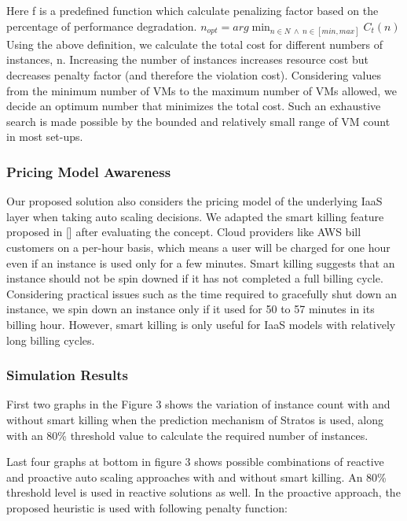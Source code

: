 Here f is a predefined function which calculate penalizing factor based on the percentage of performance degradation. $n_{opt} = arg \min_{n \in N \ \land \ n \in [min, max]}C_t(n) $
\\

Using the above definition, we calculate the total cost for different numbers of instances, n. Increasing the number of instances increases resource cost but decreases penalty factor (and therefore the violation cost). Considering values from the minimum number of VMs to the maximum number of VMs allowed, we decide an optimum number that minimizes the total cost. Such an exhaustive search is made possible by the bounded and relatively small range of VM count in most set-ups.
\subsubsection {Pricing Model Awareness}

Our proposed solution also considers the pricing model of the underlying IaaS layer when taking auto scaling decisions. We adapted the smart killing feature proposed in [\cite{pluggable}] after evaluating the concept. Cloud providers like AWS bill customers on a per-hour basis, which means a user will be charged for one hour even if an instance is used only for a few minutes. Smart killing suggests that an instance should not be spin downed if it has not completed a full billing cycle. Considering practical issues such as the time required to gracefully shut down an instance, we spin down an instance only if it used for 50 to 57 minutes in its billing hour. However, smart killing is only useful for IaaS models with relatively long billing cycles.

\subsubsection{Simulation Results}
First two graphs in the Figure 3 shows the variation of instance count with and without smart killing when the prediction mechanism of Stratos is used, along with an 80\% threshold value to calculate the required number of instances.

Last four graphs at bottom in figure 3 shows possible combinations of reactive and proactive auto scaling approaches with and without smart killing. An 80\% threshold level is used in reactive solutions as well. In the proactive approach, the proposed heuristic is used with following penalty function:

